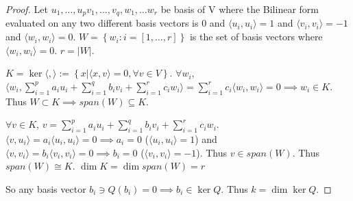\documentclass{article}
\newcommand{\angles}[1]{\langle #1 \rangle}
\begin{document}
\begin{proof}
    Let $u_1, \dots, u_p v_1, \dots, v_q, w_1, \dots w_r$ be basis of V where the Bilinear form evaluated on any two different basis vectors is 0 and $\angles{u_i, u_i} = 1$ and $\angles{v_i, v_i} = -1$ and $\angles{w_i, w_i} = 0$. $W = \left\{ w_i : i = [1, \dots, r ] \right\}$ is the set of basis vectors where $\angles{w_i ,w_i} = 0$. $r = |W|$.

    $K = \ker{\angles{ , }} := \left\{ x | \angles{x, v} = 0, \forall v \in V \right\}$. $\forall w_i$, $\angles{w_i, \sum_{i = 1}^{p}a_iu_i + \sum_{i = 1}^{q}b_iv_i + \sum_{i = 1}^{r}c_iw_i} = \sum_{i = 1}^{r}c_i \angles{w_i, w_i} = 0 \implies w_i \in K$. Thus $W \subset K \implies span(W) \subseteq K$. 
    
    $\forall v \in K$, $v = \sum_{i = 1}^{p}a_iu_i + \sum_{i = 1}^{q}b_iv_i + \sum_{i = 1}^{r}c_iw_i$. $\angles{v, u_i} = a_i\angles{u_i, u_i} = 0 \implies a_i = 0$ ($\angles{u_i, u_i} = 1$) and $\angles{v, v_i} = b_i \angles{v_i, v_i} = 0 \implies b_i = 0$ ($\angles{v_i, v_i} = -1$). Thus $v \in span(W)$. Thus $span(W) \cong K$. $\dim K = \dim span(W) = r$     

    So any basis vector $b_i \ni Q(b_i) = 0 \implies b_i \in \ker Q$. Thus $k = \dim \ker Q$.     
\end{proof}
\end{document}
